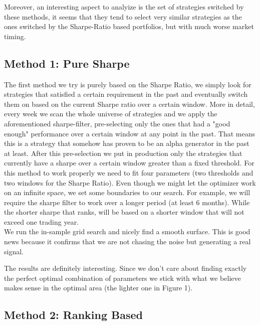 \documentclass[a4paper]{article}
\numberwithin{equation}{subsection}
\begin{document}

Moreover, an interesting aspect to analyize is the set of strategies switched by these methods, it seems that they tend to select very similar strategies as the ones switched by the Sharpe-Ratio based portfolios, but with much worse market timing.\\

\subsection*{Method 1: Pure Sharpe}

The first method we try is purely based on the Sharpe Ratio, we simply look for strategies that satisfied a certain requirement in the past and eventually switch them on based on the current Sharpe ratio over a certain window. More in detail, every week we scan the whole universe of strategies and we apply the aforementioned sharpe-filter, pre-selecting only the ones that had a "good enough" performance over a certain window at any point in the past. That means this is a strategy that somehow has proven to be an alpha generator in the past at least. After this pre-selection we put in production only the strategies that currently have a sharpe over a certain window greater than a fixed threshold. For this method to work properly we need to fit four parameters (two thresholds and two windows for the Sharpe Ratio). Even though we might let the optimizer work on an infinite space, we set some boundaries to our search. For example, we will require the sharpe filter to work over a longer period (at least 6 months). While the shorter sharpe that ranks, will be based on a shorter window that will not exceed one trading year.\\
We run the in-sample grid search and nicely find a smooth surface. This is good news because it confirms that we are not chasing the noise but generating a real signal. 


The results are definitely interesting. Since we don't care about finding exactly the perfect optimal combination of parameters we stick with what we believe makes sense in the optimal area (the lighter one in Figure 1).

\subsection*{Method 2: Ranking Based}
\end{document}
